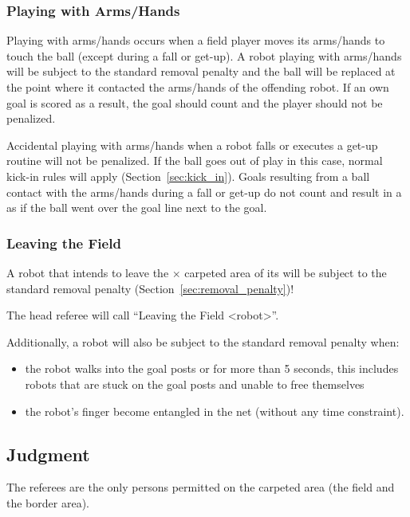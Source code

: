 \subsubsection{Playing with Arms/Hands}
\label{sec:hand_ball}

Playing with arms/hands occurs when a field player moves its arms/hands to touch the ball (except during a fall or get-up). A robot playing with arms/hands will be subject to the standard removal penalty and the ball will be replaced at the point where it contacted the arms/hands of the offending robot. If an own goal is scored as a result, the goal should count and the player should not be penalized.

Accidental playing with arms/hands when a robot falls or executes a get-up routine will not be penalized. 
If the ball goes out of play in this case, normal kick-in rules will apply (\cf Section~\ref{sec:kick_in}). 
Goals resulting from a ball contact with the arms/hands during a fall or get-up do not count and result in a  as if the ball went over the goal line next to the goal.

\subsubsection{Leaving the Field}
\label{sec:leaving_field}

A robot that intends to leave the \TotalWidth $\times$ \cbw{3.7~m\xspace} carpeted area of its  will be subject to the standard removal penalty (\cf Section~\ref{sec:removal_penalty})!


The head referee will call ``Leaving the Field \textless robot\textgreater''.

Additionally, a robot will also be subject to the standard removal penalty when:
\begin{itemize}
	\item the robot walks into the goal posts or  for more than 5 seconds, this includes robots that are stuck on the goal posts and unable to free themselves
	\item the robot's finger become entangled in the net (without any time constraint).
\end{itemize}

\subsection{Judgment}
\label{sec:judgment}
The referees are the only persons permitted on the carpeted area (\ie the field and the border area).

